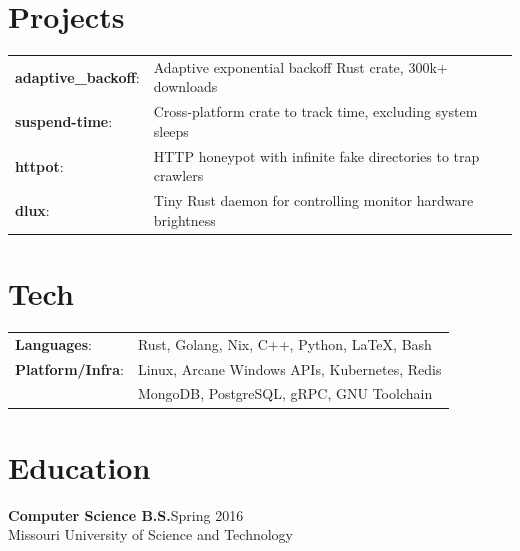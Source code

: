 \documentclass[margin]{res}
\newcommand{\github}[0]%
{%
  \hspace{-4mm}\faIcon{github}\hspace{1mm}%
}
\begin{document}
\begin{resume}
    \section{Projects}
      \begin{tabular}{l p{4in}}
        \href{https://github.com/brhoades/adaptive-backoff}{\github}\textbf{adaptive\_backoff}:     & Adaptive exponential backoff Rust crate, 300k+ downloads \\ [1pt]
        \href{https://github.com/Rippling/suspend-time}{\github}\textbf{suspend-time}:              & Cross-platform crate to track time, excluding system sleeps \\ [1pt]
        \href{https://github.com/brhoades/httpot}{\github}\textbf{httpot}:                          & HTTP honeypot with infinite fake directories to trap crawlers \\ [1pt]
        \href{https://github.com/brhoades/dlux}{\github}\textbf{dlux}:                              & Tiny Rust daemon for controlling monitor hardware brightness \\ [1pt]
      \end{tabular}

    \section{Tech}
      \begin{tabular}{l p{3.6in}}
        \textbf{Languages}:                   & Rust, Golang, Nix, C++, Python, \LaTeX, Bash \\ [1pt]
        \textbf{Platform/Infra}:              & Linux, Arcane Windows APIs, Kubernetes, Redis \\ [1pt]
                                              & MongoDB, PostgreSQL, gRPC, GNU Toolchain \\ [1pt]
      \end{tabular}
    \section{Education}
    \textbf{Computer Science B.S.}\hfill Spring 2016 \\ [1pt]
    Missouri University of Science and Technology

  \end{resume}
\end{document}
